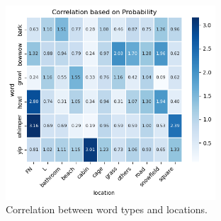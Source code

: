 

\begin{figure}[h]
\centering
\begin{subfigure}[]{0.4\textwidth}
	\centering
	\includegraphics[width=0.86\textwidth]{images/sound_location_prior.png}
	\caption{Correlation between word types and locations.}
	\label{fig:sound_location}
\end{subfigure}
\begin{subfigure}[]{0.4\textwidth}
	\centering

\end{subfigure}
\end{figure}
